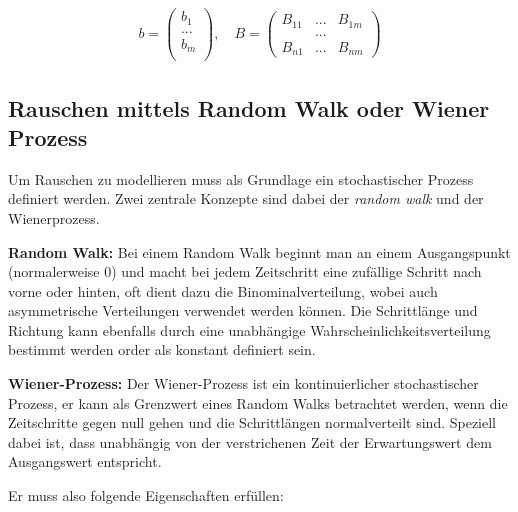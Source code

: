 \begin{align*}
		b = 
	\begin{pmatrix}
		b_{1} \\
		...\\
		b_{m}\\ 
	\end{pmatrix}
	, \quad
	B = 
	\begin{pmatrix}
		B_{11} & ... & B_{1m} \\
		& ... & \\
		B_{n1} & ... & B_{nm} 
	\end{pmatrix}
\end{align*}


\subsection{Rauschen mittels Random Walk oder Wiener Prozess
\label{brown:SDGL:Wiener}}

Um Rauschen zu modellieren muss als Grundlage ein stochastischer Prozess definiert werden. Zwei zentrale Konzepte sind dabei der \textit{random walk} und der Wienerprozess.

\begin{definition}\textbf{Random Walk:}
	\label{randomWalk}
	Bei einem Random Walk beginnt man an einem Ausgangspunkt (normalerweise 0) und macht bei jedem Zeitschritt eine zufällige Schritt nach vorne oder hinten, oft dient dazu die Binominalverteilung, wobei auch asymmetrische Verteilungen verwendet werden können. Die Schrittlänge und Richtung kann ebenfalls durch eine unabhängige Wahrscheinlichkeitsverteilung bestimmt werden order als konstant definiert sein.
\end{definition}

\begin{definition}\textbf{Wiener-Prozess:}
	\label{wienerprozess}
	Der Wiener-Prozess ist ein kontinuierlicher stochastischer Prozess, er kann als Grenzwert eines Random Walks betrachtet werden, wenn die Zeitschritte gegen null gehen und die Schrittlängen normalverteilt sind. Speziell dabei ist, dass unabhängig von der verstrichenen Zeit der Erwartungswert dem Ausgangswert entspricht.	
\end{definition}

Er muss also folgende Eigenschaften erfüllen: 



